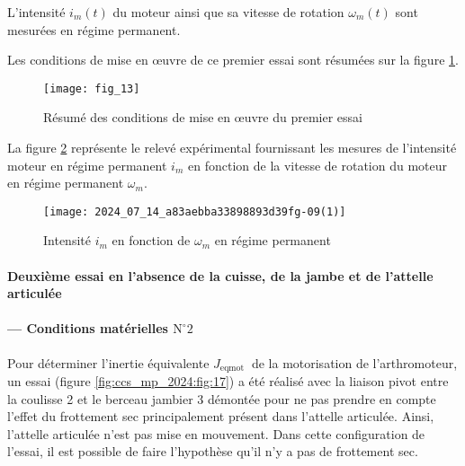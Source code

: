 L'intensité $i_{m}(t)$ du moteur ainsi que sa vitesse de rotation $\omega_{m}(t)$ sont mesurées en régime permanent.

Les conditions de mise en œuvre de ce premier essai sont résumées sur la figure \ref{fig:ccs_mp_2024:fig:13}.

\begin{figure}[!h]\centering
\texttt{[image: fig\_13]}

\caption{\label{fig:ccs_mp_2024:fig:13}Résumé des conditions de mise en œuvre du premier essai}
\end{figure}
La figure \ref{fig:ccs_mp_2024:fig:14} représente le relevé expérimental fournissant les mesures de l'intensité moteur en régime permanent $i_{m}$ en fonction de la vitesse de rotation du moteur en régime permanent $\omega_{m}$.


\begin{figure}[!h]\centering
\texttt{[image: 2024\_07\_14\_a83aebba33898893d39fg-09(1)]}
\caption{\label{fig:ccs_mp_2024:fig:14}Intensité $i_{m}$ en fonction de $\omega_{m}$ en régime permanent}
\end{figure}
\paragraph*{Deuxième essai en l'absence de la cuisse, de la jambe et de l'attelle articulée}

\paragraph*{— Conditions matérielles $\mathrm{N}^{\circ} 2$}
Pour déterminer l'inertie équivalente $J_{\text {eqmot }}$ de la motorisation de l'arthromoteur, un essai (figure \ref{fig:ccs_mp_2024:fig:17}) a été réalisé avec la liaison pivot entre la coulisse 2 et le berceau jambier 3 démontée pour ne pas prendre en compte l'effet du frottement sec principalement présent dans l'attelle articulée. Ainsi, l'attelle articulée n'est pas mise en mouvement. Dans cette configuration de l'essai, il est possible de faire l'hypothèse qu'il n'y a pas de frottement sec.

